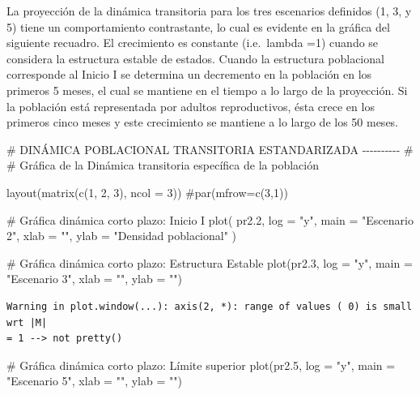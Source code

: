 \documentclass[
  12pt,
  letterpaper,
]{book}
\newenvironment{Shaded}{\begin{snugshade}}{\end{snugshade}}
\newcommand{\AttributeTok}[1]{\textcolor[rgb]{0.40,0.45,0.13}{#1}}
\newcommand{\CommentTok}[1]{\textcolor[rgb]{0.37,0.37,0.37}{#1}}
\newcommand{\DecValTok}[1]{\textcolor[rgb]{0.68,0.00,0.00}{#1}}
\newcommand{\FloatTok}[1]{\textcolor[rgb]{0.68,0.00,0.00}{#1}}
\newcommand{\FunctionTok}[1]{\textcolor[rgb]{0.28,0.35,0.67}{#1}}
\newcommand{\NormalTok}[1]{\textcolor[rgb]{0.00,0.23,0.31}{#1}}
\newcommand{\StringTok}[1]{\textcolor[rgb]{0.13,0.47,0.30}{#1}}
\begin{document}
La proyección de la dinámica transitoria para los tres escenarios
definidos (1, 3, y 5) tiene un comportamiento contrastante, lo cual es
evidente en la gráfica del siguiente recuadro. El crecimiento es
constante (i.e.~lambda =1) cuando se considera la estructura estable de
estados. Cuando la estructura poblacional corresponde al Inicio I se
determina un decremento en la población en los primeros 5 meses, el cual
se mantiene en el tiempo a lo largo de la proyección. Si la población
está representada por adultos reproductivos, ésta crece en los primeros
cinco meses y este crecimiento se mantiene a lo largo de los 50 meses.

\begin{Shaded}
\begin{Highlighting}[]
\CommentTok{\# DINÁMICA POBLACIONAL TRANSITORIA ESTANDARIZADA {-}{-}{-}{-}{-}{-}{-}{-}{-}{-} \#}
\CommentTok{\# Gráfica de la Dinámica transitoria específica de la población  }

\FunctionTok{layout}\NormalTok{(}\FunctionTok{matrix}\NormalTok{(}\FunctionTok{c}\NormalTok{(}\DecValTok{1}\NormalTok{, }\DecValTok{2}\NormalTok{, }\DecValTok{3}\NormalTok{), }\AttributeTok{ncol =} \DecValTok{3}\NormalTok{))}
\CommentTok{\#par(mfrow=c(3,1))}

\CommentTok{\# Gráfica dinámica corto plazo: Inicio I}
\FunctionTok{plot}\NormalTok{(}
\NormalTok{  pr2}\FloatTok{.2}\NormalTok{,}
  \AttributeTok{log =} \StringTok{"y"}\NormalTok{,}
  \AttributeTok{main =} \StringTok{"Escenario 2"}\NormalTok{,}
  \AttributeTok{xlab =} \StringTok{""}\NormalTok{,}
  \AttributeTok{ylab =} \StringTok{"Densidad poblacional"}
\NormalTok{)}

\CommentTok{\# Gráfica dinámica corto plazo: Estructura Estable}
\FunctionTok{plot}\NormalTok{(pr2}\FloatTok{.3}\NormalTok{, }\AttributeTok{log =} \StringTok{"y"}\NormalTok{, }\AttributeTok{main =} \StringTok{"Escenario 3"}\NormalTok{, }\AttributeTok{xlab =} \StringTok{""}\NormalTok{, }\AttributeTok{ylab =} \StringTok{""}\NormalTok{)}
\end{Highlighting}
\end{Shaded}

\begin{verbatim}
Warning in plot.window(...): axis(2, *): range of values ( 0) is small wrt |M|
= 1 --> not pretty()
\end{verbatim}

\begin{Shaded}
\begin{Highlighting}[]
\CommentTok{\# Gráfica dinámica corto plazo: Límite superior}
\FunctionTok{plot}\NormalTok{(pr2}\FloatTok{.5}\NormalTok{, }\AttributeTok{log =} \StringTok{"y"}\NormalTok{, }\AttributeTok{main =} \StringTok{"Escenario 5"}\NormalTok{, }\AttributeTok{xlab =} \StringTok{""}\NormalTok{, }\AttributeTok{ylab =} \StringTok{""}\NormalTok{)}
\end{Highlighting}
\end{Shaded}
\end{document}
